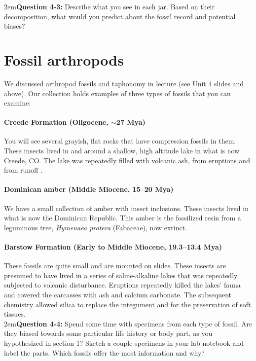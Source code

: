 \documentclass[letterpaper, 11pt]{article}
\begin{document}
\hangindent2em\textbf{Question 4-3:} Describe what you see in each jar. Based on their decomposition, what would you predict about the fossil record and potential biases?

\section{Fossil arthropods}
We discussed arthropod fossils and taphonomy in lecture (see Unit 4 slides and above). Our collection holds examples of three types of fossils that you can examine: 

\paragraph{Creede Formation (Oligocene, $\sim$27 Mya)} You will see several grayish, flat rocks that have compression fossils in them. These insects lived in and around a shallow, high altitude lake in what is now Creede, CO. The lake was repeatedly filled with volcanic ash, from eruptions and from runoff \citep{berkeley}.

\paragraph{Dominican amber (Middle Miocene, 15--20 Mya)} We have a small collection of amber with insect inclusions. These insects lived in what is now the Dominican Republic. This amber is the fossilized resin from a leguminous tree, \textit{Hymenaea protera} (Fabaceae), now extinct.

\paragraph{Barstow Formation (Early to Middle Miocene, 19.3--13.4 Mya)} These fossils are quite small and are mounted on slides. These insects are presumed to have lived in a series of saline-alkaline lakes that was repeatedly subjected to volcanic disturbance. Eruptions repeatedly killed the lakes' fauna and covered the carcasses with ash and calcium carbonate. The subsequent chemistry allowed silica to replace the integument and for the preservation of soft tissues.\\

\hangindent2em\textbf{Question 4-4:} Spend some time with specimens from each type of fossil. Are they biased towards some particular life history or body part, as you hypothesized in section 1? Sketch a couple specimens in your lab notebook and label the parts. Which fossils offer the most information and why?
\end{document}
